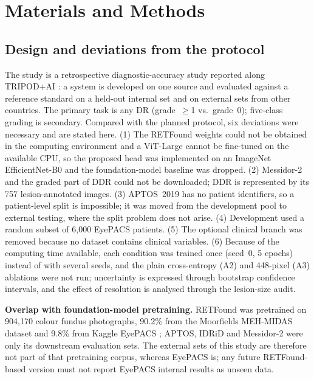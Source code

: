 \section{Materials and Methods}\label{sec:mm}
\subsection{Design and deviations from the protocol}
The study is a retrospective diagnostic-accuracy study reported along TRIPOD+AI \cite{collins2024}: a system is developed on one source and evaluated against a reference standard on a held-out internal set and on external sets from other countries. The primary task is any DR (grade~$\geq$1 vs.\ grade~0); five-class grading is secondary. Compared with the planned protocol, six deviations were necessary and are stated here. (1) The RETFound weights could not be obtained in the computing environment and a ViT-Large cannot be fine-tuned on the available CPU, so the proposed head was implemented on an ImageNet EfficientNet-B0 \cite{tan2019} and the foundation-model baseline was dropped. (2) Messidor-2 and the graded part of DDR could not be downloaded; DDR is represented by its 757 lesion-annotated images. (3) APTOS~2019 has no patient identifiers, so a patient-level split is impossible; it was moved from the development pool to external testing, where the split problem does not arise. (4) Development used a random subset of 6{,}000 EyePACS patients. (5) The optional clinical branch was removed because no dataset contains clinical variables. (6) Because of the computing time available, each condition was trained once (seed~0, 5 epochs) instead of with several seeds, and the plain cross-entropy (A2) and 448-pixel (A3) ablations were not run; uncertainty is expressed through bootstrap confidence intervals, and the effect of resolution is analysed through the lesion-size audit.

\textbf{Overlap with foundation-model pretraining.} RETFound was pretrained on 904{,}170 colour fundus photographs, 90.2\% from the Moorfields MEH-MIDAS dataset and 9.8\% from Kaggle EyePACS \cite{zhou2023}; APTOS, IDRiD and Messidor-2 were only its downstream evaluation sets. The external sets of this study are therefore not part of that pretraining corpus, whereas EyePACS is; any future RETFound-based version must not report EyePACS internal results as unseen data.

